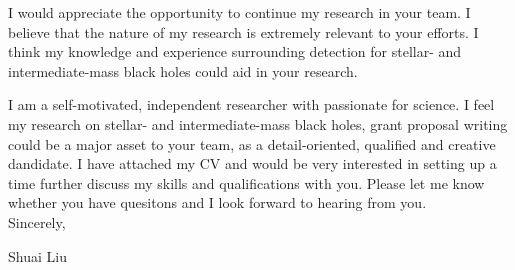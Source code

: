 \documentclass[11pt,a4paper,sans]{letter} %
\begin{document}
I would appreciate the opportunity to continue my research in your team. I
    believe that the nature of my research is extremely relevant to your efforts. I think my knowledge and
    experience surrounding detection for stellar- and intermediate-mass black holes could aid in your research.

I am a self-motivated, independent researcher with passionate for science. I feel my research on stellar- and
    intermediate-mass black holes, grant proposal writing could be a major asset to your team, as a detail-oriented,
    qualified and creative dandidate. I have attached my CV and would be very interested in setting up a time further
    discuss my skills and qualifications with you. Please let me know whether you have quesitons and I look forward to
    hearing from you.\\


Sincerely,

Shuai Liu




\end{document}
